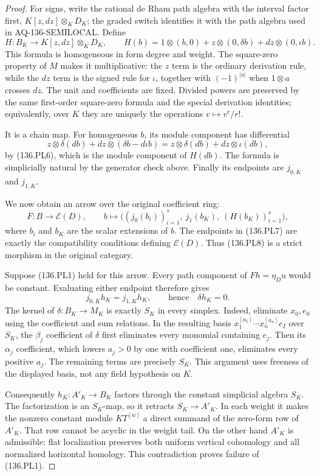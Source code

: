 \begin{proof}
For signs, write the rational de Rham path algebra with the
interval factor first,
$K[z,dz]\otimes_K D_K$; the graded switch identifies it
with the path algebra used in AQ-136-SEMILOCAL. Define
\[
 H:B_K\longrightarrow K[z,dz]\otimes_K D_K,\qquad
 H(b)=1\otimes(b,0)+z\otimes(0,\delta b)
                         +dz\otimes(0,\iota b).           \tag{136.PL7}
\]
This formula is homogeneous in form degree and weight.
The square-zero property of $M$ makes it multiplicative:
the $z$ term is the ordinary derivation rule, while the
$dz$ term is the signed rule for $\iota$, together with
$(-1)^{|a|}$ when $1\otimes a$ crosses $dz$.
The unit and coefficients are fixed. Divided powers are
preserved by the same first-order square-zero formula
and the special derivation identities; equivalently, over
$K$ they are uniquely the operations $v\mapsto v^r/r!$.

It is a chain map. For homogeneous $b$, its module component
has differential
\[
 z\otimes\delta(db)+dz\otimes(\delta b-d\iota b)
          =z\otimes\delta(db)+dz\otimes\iota(db),
\]
by (136.PL6), which is the module component of $H(db)$.
The formula is simplicially natural by the generator check
above. Finally its endpoints are $j_{0,K}$ and $j_{1,K}$.

We now obtain an arrow over the original coefficient ring:
\[
 F:B\longrightarrow\mathcal E(D),\qquad
 b\longmapsto
 \bigl((j_0(b_i))_{i=1}^s,\ j_1(b_K),\ (H(b_K))_{i=1}^s\bigr),
                                                               \tag{136.PL8}
\]
where $b_i$ and $b_K$ are the scalar extensions of $b$.
The endpoints in (136.PL7) are exactly the compatibility
conditions defining $\mathcal E(D)$. Thus (136.PL8) is a
strict morphism in the original category.

Suppose (136.PL1) held for this arrow. Every path component
of $Fh=\eta_Du$ would be constant. Evaluating either endpoint
therefore gives
\[
                  j_{0,K}h_K=j_{1,K}h_K,
                    \qquad\text{hence}\quad\delta h_K=0.  \tag{136.PL9}
\]
The kernel of $\delta:B_K\to M_K$ is exactly $S_K$ in every
simplex. Indeed, eliminate $x_0,e_0$ using the coefficient
and sum relations. In the resulting basis
$x_1^{[a_1]}\cdots x_n^{[a_n]}e_I$ over $S_K$, the
$\beta_j$ coefficient of $\delta$ first eliminates every
monomial containing $e_j$. Then its $\alpha_j$ coefficient,
which lowers $a_j>0$ by one with coefficient one, eliminates
every positive $a_j$. The remaining terms are precisely
$S_K$. This argument uses freeness of the displayed basis,
not any field hypothesis on $K$.

Consequently $h_K:A'_K\to B_K$ factors through the constant
simplicial algebra $S_K$. The factorization is an $S_K$-map,
so it retracts $S_K\to A'_K$. In each weight it makes the
nonzero constant module $KT^{[w]}$ a direct summand of the
zero-form row of $A'_K$. That row cannot be acyclic in the
weight tail. On the other hand $A'_K$ is admissible: flat
localization preserves both uniform vertical cohomology
and all normalized horizontal homology. This contradiction
proves failure of (136.PL1).
\end{proof}

